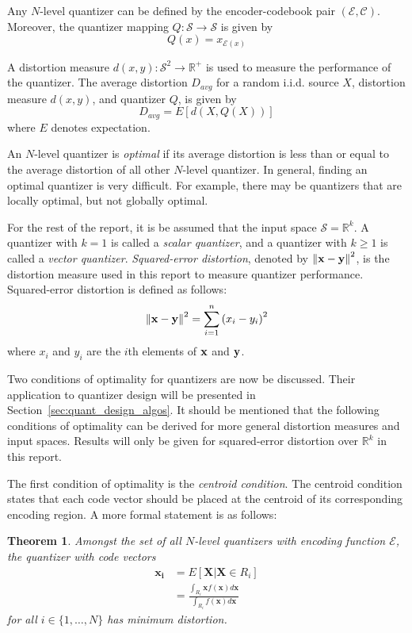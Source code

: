 \documentclass[10pt]{article}
\newtheorem{theorem}{Theorem}[section]
\begin{document}
Any $N$-level quantizer can be defined by the encoder-codebook pair $(\mathcal{E}, \mathcal{C})$. Moreover, the quantizer mapping $Q : \mathcal{S} \rightarrow \mathcal{S}$ is given by
\begin{equation}
Q(x) = x_{\mathcal{E}(x)}
\end{equation}

A distortion measure $d(x,y) : \mathcal{S}^2 \rightarrow \mathbb{R}^+$ is used to measure the performance of the quantizer. The average distortion $D_{avg}$ for a random i.i.d. source $X$, distortion measure $d(x,y)$, and quantizer $Q$, is given by
\begin{equation}
  \label{eq:D_avg}
D_{avg} = E[d(X,Q(X))]
\end{equation}
where $E$ denotes expectation.

An $N$-level quantizer is \emph{optimal} if its average distortion is less than or equal to the average distortion of all other $N$-level quantizer. In general, finding an optimal quantizer is very difficult. For example, there may be quantizers that are locally optimal, but not globally optimal.

For the rest of the report, it is be assumed that the input space $\mathcal{S}=\mathbb{R}^k$. A quantizer with $k=1$ is called a \emph{scalar quantizer}, and a quantizer with $k \ge 1$ is called a \emph{vector quantizer}. \emph{Squared-error distortion}, denoted by ${\bf {\| x - y \|}}^2$, is the distortion measure used in this report to measure quantizer performance. Squared-error distortion is defined as follows:
\begin{equation}
{\bf {\| x - y \|}}^2 = \sum_{i=1}^n{(x_i - y_i)}^2
\end{equation}
where $x_i$ and $y_i$ are the $i$th elements of $\bf x$ and $\bf y$.

Two conditions of optimality for quantizers are now be discussed. Their application to quantizer design will be presented in Section~\ref{sec:quant_design_algos}. It should be mentioned that the following conditions of optimality can be derived for more general distortion measures and input spaces. Results will only be given for squared-error distortion over $\mathbb{R}^k$ in this report.

The first condition of optimality is the \emph{centroid condition}. The centroid condition states that each code vector should be placed at the centroid of its corresponding encoding region. A more formal statement is as follows:

\begin{theorem}
\label{theo:cent_vq}
Amongst the set of all $N$-level quantizers with encoding function $\mathcal{E}$, the quantizer with code vectors
\begin{align}
  \label{eq:cent_vq}
  \mathbf{x_i} &= E[\mathbf{X} | \mathbf{X} \in R_i] \\
&= \frac{ \int_{R_i}\mathbf{x}f(\mathbf{x})d\mathbf{x} }{ \int_{R_i}f(\mathbf{x})d\mathbf{x} }
\end{align}
for all $i \in \{1,\ldots,N\}$ has minimum distortion.
\end{theorem}
\end{document}
